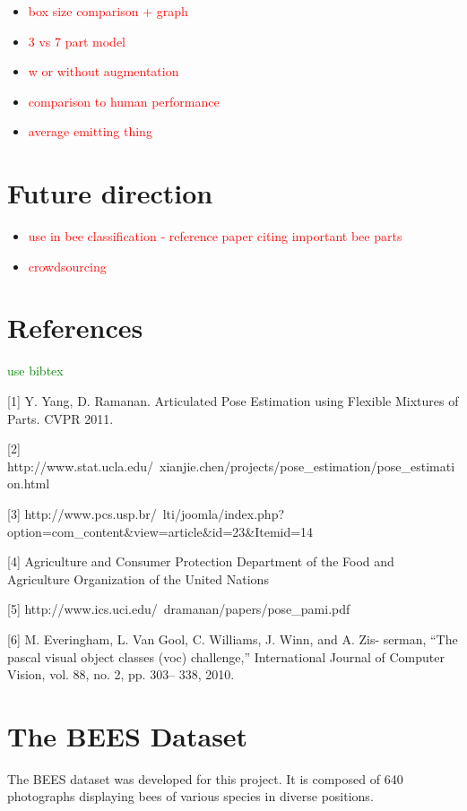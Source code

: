 \documentclass[11pt, oneside]{report}
\newcommand{\comment}[1]{\textcolor{red}{#1}}
\newcommand{\pcomment}[1]{\textcolor{green}{#1}}
\begin{document}
    \begin{itemize}
    \item
        \comment{box size comparison + graph}
    \item
        \comment{3 vs 7 part model}
    \item
        \comment{w or without augmentation}
    \item
        \comment{comparison to human performance}
    \item
        \comment{average emitting thing}
    \end{itemize}

\chapter{Future direction}
    \begin{itemize}
    \item
        \comment{use in bee classification - reference paper citing important bee parts}
    \item
        \comment{crowdsourcing}
    \end{itemize}

\chapter{References}
\pcomment{use bibtex}

[1] Y. Yang, D. Ramanan. Articulated Pose Estimation using Flexible Mixtures of Parts. CVPR 2011.

[2] http://www.stat.ucla.edu/~xianjie.chen/projects/pose\_estimation/pose\_estimation.html

[3] http://www.pcs.usp.br/~lti/joomla/index.php?option=com\_content\&view=article\&id=23\&Itemid=14

[4] Agriculture and Consumer Protection Department of the Food and Agriculture Organization of the United Nations

[5] http://www.ics.uci.edu/~dramanan/papers/pose\_pami.pdf

[6] M. Everingham, L. Van Gool, C. Williams, J. Winn, and A. Zis- serman, “The pascal visual object classes (voc) challenge,”
International Journal of Computer Vision, vol. 88, no. 2, pp. 303–
338, 2010.



\appendix
\chapter{The BEES Dataset}
    The BEES dataset was developed for this project. It is composed of 640 photographs displaying bees of various species in diverse positions.
\end{document}
